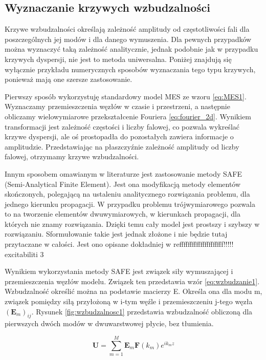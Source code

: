 

\subsection{Wyznaczanie krzywych wzbudzalności}

Krzywe wzbudzalności określają zależność amplitudy od częstotliwości fali dla poszczególnych jej modów i dla danego wymuszenia. Dla pewnych przypadków można wyznaczyć taką zależność analitycznie, jednak podobnie jak w przypadku krzywych dyspersji, nie jest to metoda uniwersalna. Poniżej znajdują się wyłącznie przykładu numerycznych sposobów wyznaczania tego typu krzywych, ponieważ mają one szersze zastosowanie.

Pierwszy sposób wykorzystuję standardowy model MES ze wzoru \ref{eq:MES1}. Wyznaczamy przemieszczenia węzłów w czasie i przestrzeni, a następnie obliczamy wielowymiarowe przekształcenie Fouriera \ref{eq:fourier_2d}. Wynikiem transformacji jest zależność częstości i liczby falowej, co pozwala wykreślać krzywe dyspersji, ale oś prostopadła do pozostałych zawiera informacje o amplitudzie. Przedstawiając na płaszczyźnie zależność amplitudy od liczby falowej, otrzymamy krzywe wzbudzalności.

Innym sposobem omawianym w literaturze jest zastosowanie metody SAFE (Semi-Analytical Finite Element). Jest ona modyfikacją metody elementów skończonych, polegającą na ustaleniu analitycznego rozwiązania problemu, dla jednego kierunku propagacji. W przypadku problemu trójwymiarowego pozwala to na tworzenie elementów dwuwymiarowych, w kierunkach propagacji, dla których nie znamy rozwiązania. Dzięki temu cały model jest prostszy i szybszy w rozwiązaniu. Sformułowanie takie jest jednak złożone i nie będzie tutaj przytaczane w całości. Jest ono opisane dokładniej w refffffffffffffffffffff!!!!! excitabiliti 3

Wynikiem wykorzystania metody SAFE jest związek siły wymuszającej i przemieszczenia węzłów modelu. Związek ten przedstawia wzór \ref{eq:wzbudzanie1}. Wzbudzalność określić można na podstawie macierzy E. Określa ona dla modu m, związek pomiędzy siłą przyłożoną w i-tym węźle i przemieszczeniu j-tego węzła \( (\textbf{E}_m)_{ij} \). Rysunek \ref{fig:wzbudzalnosc1} przedstawia wzbudzalność obliczoną dla pierwszych dwóch modów w dwuwarstwowej płycie, bez tłumienia.

\begin{equation} \label{eq:wzbudzanie1}
\textbf{U} = \sum_{m=1}^M \textbf{E}_m \textbf{F}(k_m) e^{ik_m z}
\end{equation}


